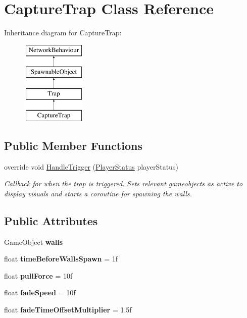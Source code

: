 \hypertarget{class_capture_trap}{}\section{Capture\+Trap Class Reference}
\label{class_capture_trap}
Inheritance diagram for Capture\+Trap\+:\begin{figure}[H]
\begin{center}
\leavevmode
\includegraphics[height=4.000000cm]{class_capture_trap}
\end{center}
\end{figure}
\subsection*{Public Member Functions}
\begin{DoxyCompactItemize}
\item 
override void \hyperlink{class_capture_trap_ac770502ec2d9a7e1fbc2ed4ce7f0ec8f}{Handle\+Trigger} (\hyperlink{class_player_status}{Player\+Status} player\+Status)
\begin{DoxyCompactList}\small\item\em Callback for when the trap is triggered. Sets relevant gameobjects as active to display visuals and starts a coroutine for spawning the walls. \end{DoxyCompactList}\end{DoxyCompactItemize}
\subsection*{Public Attributes}
\begin{DoxyCompactItemize}
\item 
\hypertarget{class_capture_trap_aa28f725f18c5a9c481f0e5713bce7832}{}\label{class_capture_trap_aa28f725f18c5a9c481f0e5713bce7832} 
Game\+Object {\bfseries walls}
\item 
\hypertarget{class_capture_trap_a9f4445e87b30cd8bf75b03579c8aff20}{}\label{class_capture_trap_a9f4445e87b30cd8bf75b03579c8aff20} 
float {\bfseries time\+Before\+Walls\+Spawn} = 1f
\item 
\hypertarget{class_capture_trap_a8c92d697cae971b9acec5ac5fff9e148}{}\label{class_capture_trap_a8c92d697cae971b9acec5ac5fff9e148} 
float {\bfseries pull\+Force} = 10f
\item 
\hypertarget{class_capture_trap_a42d1ab53ce3774e26c1db906292bb339}{}\label{class_capture_trap_a42d1ab53ce3774e26c1db906292bb339} 
float {\bfseries fade\+Speed} = 10f
\item 
\hypertarget{class_capture_trap_a21ae2cdd4bd27cd6801fde7b750d1cb9}{}\label{class_capture_trap_a21ae2cdd4bd27cd6801fde7b750d1cb9} 
float {\bfseries fade\+Time\+Offset\+Multiplier} = 1.\+5f
\end{DoxyCompactItemize}
